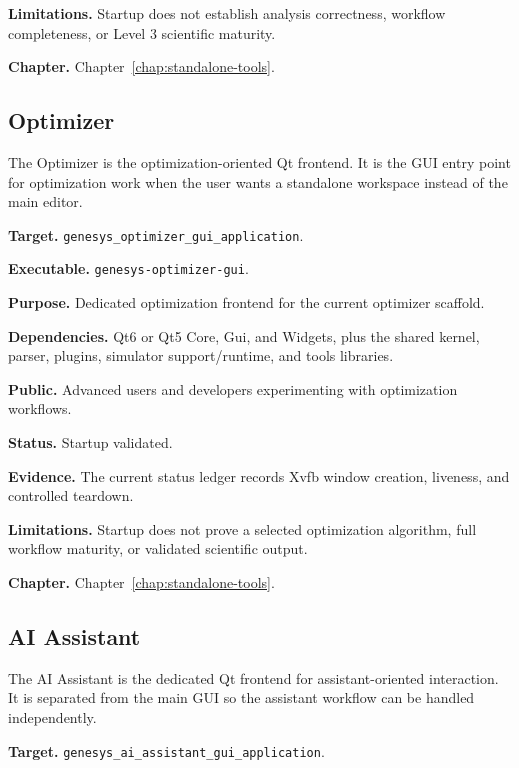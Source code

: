 \noindent\textbf{Limitations.} Startup does not establish analysis correctness, workflow completeness, or Level 3 scientific maturity.

\noindent\textbf{Chapter.} Chapter~\ref{chap:standalone-tools}.

\subsection{Optimizer}
\label{subsec:application-overview-optimizer}

The Optimizer is the optimization-oriented Qt frontend. It is the GUI entry
point for optimization work when the user wants a standalone workspace instead
of the main editor.

\noindent\textbf{Target.} \texttt{genesys\_optimizer\_gui\_application}.

\noindent\textbf{Executable.} \texttt{genesys-optimizer-gui}.

\noindent\textbf{Purpose.} Dedicated optimization frontend for the current optimizer scaffold.

\noindent\textbf{Dependencies.} Qt6 or Qt5 Core, Gui, and Widgets, plus the shared kernel, parser, plugins, simulator support/runtime, and tools libraries.

\noindent\textbf{Public.} Advanced users and developers experimenting with optimization workflows.

\noindent\textbf{Status.} Startup validated.

\noindent\textbf{Evidence.} The current status ledger records Xvfb window creation, liveness, and controlled teardown.

\noindent\textbf{Limitations.} Startup does not prove a selected optimization algorithm, full workflow maturity, or validated scientific output.

\noindent\textbf{Chapter.} Chapter~\ref{chap:standalone-tools}.

\subsection{AI Assistant}
\label{subsec:application-overview-ai-assistant}

The AI Assistant is the dedicated Qt frontend for assistant-oriented
interaction. It is separated from the main GUI so the assistant workflow can be
handled independently.

\noindent\textbf{Target.} \texttt{genesys\_ai\_assistant\_gui\_application}.

